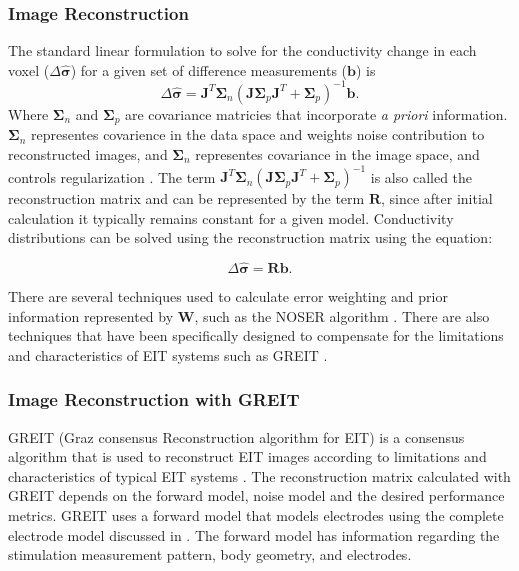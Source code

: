 \subsubsection{Image Reconstruction}
The standard linear formulation \parencite{holder_electrical_2004} 
to solve for the conductivity change in each 
voxel ($\Delta \mathbf{\hat{\sigma}}$) for a given set of difference measurements ($\mathbf{b}$) is
\begin{equation}
	\Delta \mathbf{\hat{\sigma}} = \mathbf{J}^T \mathbf{\Sigma}_n 
	(\mathbf{J} \mathbf{\Sigma}_p \mathbf{J}^T + \mathbf{\Sigma}_p)^{-1} \mathbf{b}. 
\end{equation}
Where $\mathbf{\Sigma}_n$ and $\mathbf{\Sigma}_p$ are covariance matricies that 
incorporate \emph{a priori} information. 
$\mathbf{\Sigma}_n$ representes covarience in the data space and weights noise 
contribution to reconstructed images, and
$\mathbf{\Sigma}_n$ representes covariance in the image space, and 
controls regularization \parencite{adler_electrical_1996}.
The term $ \mathbf{J}^T  \mathbf{\Sigma}_n
(\mathbf{J} \mathbf{\Sigma}_p \mathbf{J}^T + \mathbf{\Sigma}_p)^{-1} $ is also called the 
reconstruction matrix and can be represented by the term
$\mathbf{R}$, since after initial calculation it typically remains constant for a given model. 
Conductivity distributions can be solved using the reconstruction matrix using the equation:

\begin{equation} \label{eq:rm_solve}
	\Delta \mathbf{\hat{\sigma}} = \mathbf{R} \mathbf{b}. 
\end{equation}

There are several techniques used to calculate error weighting and prior information represented by 
$\mathbf{W}$,
such as the NOSER algorithm \parencite{cheney_noser_1990}. There are also 
techniques that have been specifically designed 
to compensate for the limitations and characteristics of EIT systems 
such as GREIT \parencite{adler_greit_2009}.

\subsubsection{Image Reconstruction with GREIT}

GREIT (Graz consensus Reconstruction algorithm for EIT) is 
a consensus algorithm that is used to reconstruct EIT images 
according to limitations and characteristics of typical EIT systems 
\parencite{adler_greit_2009}. 
The reconstruction matrix calculated with GREIT depends on the
forward model, noise model and the desired performance metrics.
GREIT uses a forward model that models electrodes using 
the complete electrode model discussed in .
The forward model has information regarding the stimulation measurement pattern,
body geometry, and electrodes.

